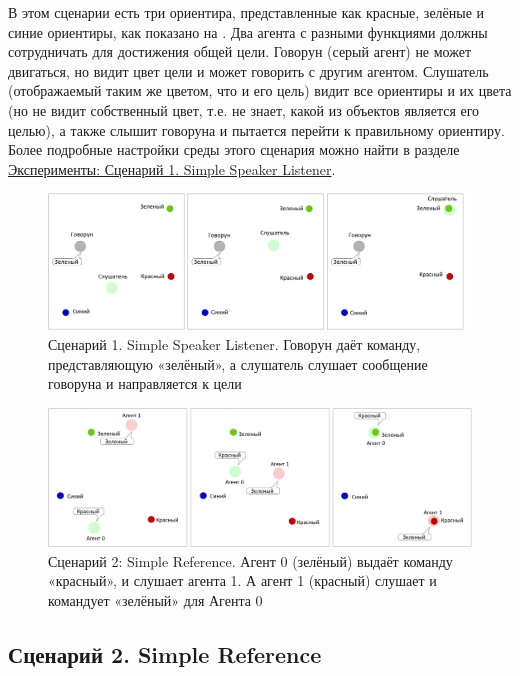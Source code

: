 В этом сценарии есть три ориентира, представленные как красные, зелёные и синие ориентиры, как показано на . Два агента с разными функциями должны сотрудничать для достижения общей цели. Говорун (серый агент) не может двигаться, но видит цвет цели и может говорить с другим агентом. Слушатель (отображаемый таким же цветом, что и его цель) видит все ориентиры и их цвета (но не видит собственный цвет, т.е. не знает, какой из объектов является его целью), а также слышит говоруна и пытается перейти к правильному ориентиру. Более подробные настройки среды этого сценария можно найти в разделе \hyperref[exp-ssl]{Эксперименты: Сценарий 1. Simple Speaker Listener}.

\begin{figure}[ht!]
    \center
    \includegraphics [scale=0.41] {my_folder/images/intro/ssl.png}
    \caption{Сценарий 1. Simple Speaker Listener. Говорун даёт команду, представляющую «зелёный», а слушатель слушает сообщение говоруна и направляется к цели}
    \label{fig-intro-ssl}
\end{figure}

\begin{figure}[ht!]
    \center
    \includegraphics [scale=0.38] {my_folder/images/intro/sr.png}
    \caption{Сценарий 2: Simple Reference. Агент 0 (зелёный) выдаёт команду «красный», и слушает агента 1. А агент 1 (красный) слушает и командует «зелёный» для Агента 0}
    \label{fig-intro-sr}
\end{figure}

\subsection{Сценарий 2. Simple Reference} \label{intro-sr}

